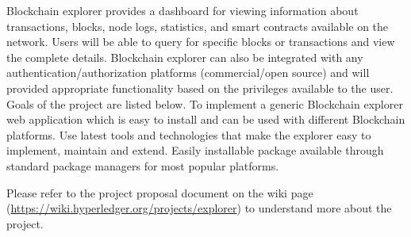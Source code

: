 Blockchain explorer provides a dashboard for viewing information about transactions, blocks, node logs, statistics,  and smart contracts available on the network. Users will be able to query for specific blocks or transactions and view the complete details. Blockchain explorer can also be integrated with any authentication/authorization platforms (commercial/open source) and will provided appropriate functionality based on the privileges available to the user. 
Goals of the project are listed below.
To implement a generic Blockchain explorer web application which is easy to install and can be used with different Blockchain platforms.
Use latest tools and technologies that make the explorer easy to implement, maintain and extend.
Easily installable package available through standard package managers for most popular platforms.

Please refer to the project proposal document on the wiki page (\url{https://wiki.hyperledger.org/projects/explorer}) to understand more about the project.
